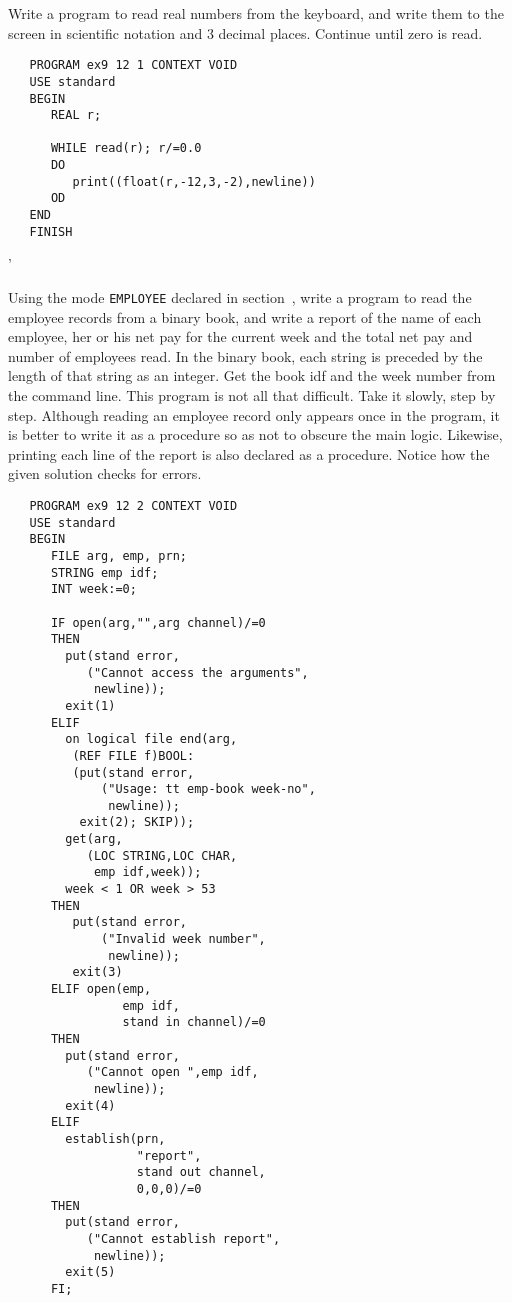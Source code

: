 \begin{exercise}
\item Write a program to read real numbers from the keyboard, and
write them to the screen in scientific notation and 3 decimal places.
Continue until zero is read. \ans \ %
\begin{verbatim}
   PROGRAM ex9 12 1 CONTEXT VOID
   USE standard
   BEGIN
      REAL r;

      WHILE read(r); r/=0.0
      DO
         print((float(r,-12,3,-2),newline))
      OD
   END
   FINISH
\end{verbatim}
'
\item Using the mode \verb|EMPLOYEE| declared in
section~, write a program to read the employee
records from a binary book, and write a report of the name of each
employee, her or his net pay for the current week and the total net
pay and number of employees read. In the binary book, each string is
preceded by the length of that string as an integer. Get the book idf
and the week number from the command line. \ans This program is not
all that difficult. Take it slowly, step by step.  Although reading
an employee record only appears once in the program, it is better to
write it as a procedure so as not to obscure the main logic.
Likewise, printing each line of the report is also declared as a
procedure. Notice how the given solution checks for errors.
\begin{verbatim}
   PROGRAM ex9 12 2 CONTEXT VOID
   USE standard
   BEGIN
      FILE arg, emp, prn;
      STRING emp idf;
      INT week:=0;

      IF open(arg,"",arg channel)/=0
      THEN
        put(stand error,
           ("Cannot access the arguments",
            newline));
        exit(1)
      ELIF
        on logical file end(arg,
         (REF FILE f)BOOL:
         (put(stand error,
             ("Usage: tt emp-book week-no",
              newline));
          exit(2); SKIP));
        get(arg,
           (LOC STRING,LOC CHAR,
            emp idf,week));
        week < 1 OR week > 53
      THEN
         put(stand error,
             ("Invalid week number",
              newline));
         exit(3)
      ELIF open(emp,
                emp idf,
                stand in channel)/=0
      THEN
        put(stand error,
           ("Cannot open ",emp idf,
            newline));
        exit(4)
      ELIF
        establish(prn,
                  "report",
                  stand out channel,
                  0,0,0)/=0
      THEN
        put(stand error,
           ("Cannot establish report",
            newline));
        exit(5)
      FI;


\end{verbatim}
\end{exercise}
